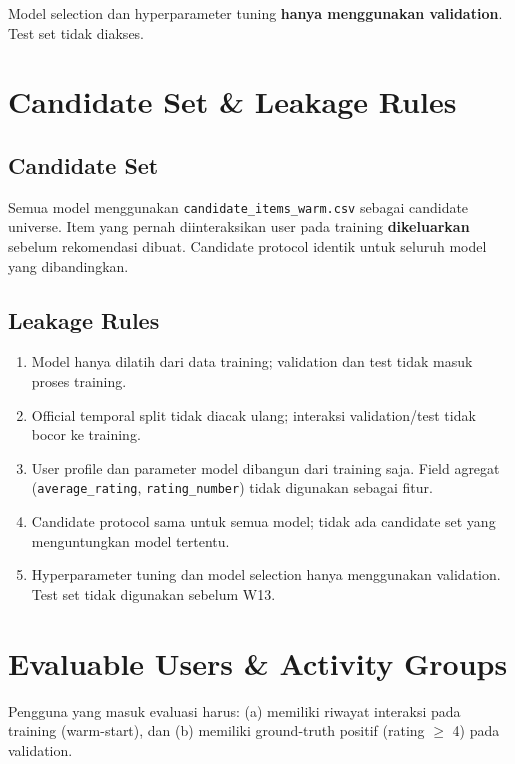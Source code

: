 \documentclass[10pt,a4paper]{article}
\begin{document}
Model selection dan hyperparameter tuning \textbf{hanya menggunakan validation}. Test set tidak diakses.

\section{Candidate Set \& Leakage Rules}

\subsection{Candidate Set}
Semua model menggunakan \texttt{candidate\_items\_warm.csv} sebagai candidate universe.
Item yang pernah diinteraksikan user pada training \textbf{dikeluarkan} sebelum rekomendasi dibuat.
Candidate protocol identik untuk seluruh model yang dibandingkan.

\subsection{Leakage Rules}
\begin{enumerate}[leftmargin=*, nosep]
  \item Model hanya dilatih dari data training; validation dan test tidak masuk proses training.
  \item Official temporal split tidak diacak ulang; interaksi validation/test tidak bocor ke training.
  \item User profile dan parameter model dibangun dari training saja. Field agregat
        (\texttt{average\_rating}, \texttt{rating\_number}) tidak digunakan sebagai fitur.
  \item Candidate protocol sama untuk semua model; tidak ada candidate set yang
        menguntungkan model tertentu.
  \item Hyperparameter tuning dan model selection hanya menggunakan validation.
        Test set tidak digunakan sebelum W13.
\end{enumerate}

\section{Evaluable Users \& Activity Groups}

Pengguna yang masuk evaluasi harus: (a) memiliki riwayat interaksi pada training (warm-start),
dan (b) memiliki ground-truth positif (rating $\geq$ 4) pada validation.
\end{document}

